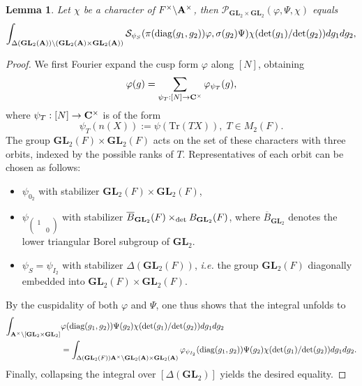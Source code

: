 \documentclass[11pt, reqno]{amsart}
\theoremstyle{plain}
\newtheorem{lemma}[theorem]{Lemma}
\theoremstyle{definition}
\theoremstyle{remark}
\theoremstyle{plain}
\def\C{{\bf C}}
\def\A{{\bf A}}
\def\GL{\mathbf{GL}}
\begin{document}
\begin{lemma}\label{GL2:period:To:Shal}
    Let $\chi$ be a character of $F^{\times}\backslash \A^{\times}$, then $\mathcal{P}_{\GL_2\times\GL_2}(\varphi,\Psi,\chi)$ equals
    \begin{align*}\int_{\Delta(\GL_2(\A))\setminus (\GL_2(\A)\times \GL_2(\A))}\mathcal{S}_{\psi_S}(\pi(\mathrm{diag}(g_1,g_2))\varphi,\sigma(g_2)\Psi)\chi(\mathrm{det}(g_1)/\mathrm{det}(g_2))dg_1dg_2,
    \end{align*}
\end{lemma}
\begin{proof}
    We first Fourier expand the cusp form $\varphi$ along $[N]$, obtaining
    \[\varphi(g) = \sum_{\psi_{T}:[N]\to \C^{\times}}\varphi_{\psi_{T}}(g),\]
where $\psi_T:[N]\to \C^{\times}$ is of the form 
    \[\psi_{T}(n(X)) := \psi(\mathrm{Tr}(TX)),\;T\in M_2(F).\]
    The group $\GL_2(F)\times \GL_2(F)$ acts on the set of these characters with three orbits, indexed by the possible ranks of $T$. Representatives of each orbit  can be chosen as follows: \begin{itemize}
        \item $\psi_{0_2}$ with stabilizer $\GL_2(F)\times\GL_2(F)$,
        \item $\psi_{\left(\begin{smallmatrix}1& \\ & 0\end{smallmatrix}\right)}$ with stabilizer $\overline{B}_{\GL_2}(F)\times_{\rm det} B_{\GL_2}(F)$, where $\overline{B}_{\GL_2}$ denotes the lower triangular Borel subgroup of $\GL_2$. 
        \item $\psi_S = \psi_{I_2}$ with stabilizer $\Delta(\GL_2(F))$, \textit{i.e.} the group $\GL_2(F)$ diagonally embedded into $\GL_2(F)\times \GL_2(F)$. 
    \end{itemize}  By the cuspidality of both $\varphi$ and $\Psi$, one thus shows that the integral unfolds to 
    \begin{align*}
    \int_{\A^\times \backslash[\GL_2\times \GL_2]}&\varphi(\mathrm{diag}(g_1,g_2))\Psi(g_2)\chi(\mathrm{det}(g_1)/\mathrm{det}(g_2))dg_1dg_2 \\&= \int_{\Delta(\GL_2(F))\A^\times \backslash\GL_2(\A)\times \GL_2(\A)}\varphi_{\psi_{I_2}}(\mathrm{diag}(g_1,g_2))\Psi(g_2)\chi(\mathrm{det}(g_1)/\mathrm{det}(g_2))dg_1dg_2.
    \end{align*}
    Finally, collapsing the integral over $[\Delta(\GL_2)]$ yields the desired equality.
\end{proof}
\end{document}
